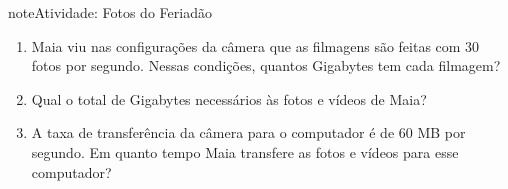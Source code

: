 \begin{sphinxadmonition}{note}{Atividade: Fotos do Feriadão}
\begin{enumerate}
\(\Box\) 4K significa que cada foto da filmagem tem \(3\,840 \times 2\,160\) pixels, ou seja, aproximadamente \(8\) MP.

\item {} 
Maia viu nas configurações da câmera que as filmagens são feitas com 30 fotos por segundo. Nessas condições, quantos Gigabytes tem cada filmagem?

\item {} 
Qual o total de Gigabytes necessários às fotos e vídeos de Maia?

\item {} 
A taxa de transferência da câmera para o computador é de 60 MB por segundo. Em quanto tempo Maia transfere as fotos e vídeos para esse computador?

\end{enumerate}
\end{sphinxadmonition}

